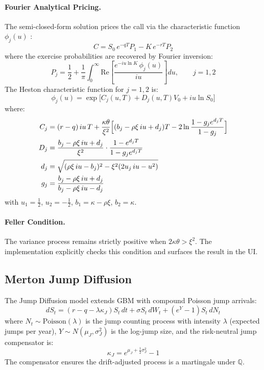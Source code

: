 \documentclass[12pt,a4paper]{article}
\begin{document}
\paragraph{Fourier Analytical Pricing.}
The semi-closed-form solution prices the call via the characteristic function $\phi_j(u)$ \parencite{heston1993}:
\begin{equation}
C = S_0\,e^{-qT}P_1 - K\,e^{-rT}P_2
\end{equation}
where the exercise probabilities are recovered by Fourier inversion:
\begin{equation}
P_j = \frac{1}{2} + \frac{1}{\pi}\int_0^{\infty}\text{Re}\!\left[\frac{e^{-iu\ln K}\,\phi_j(u)}{iu}\right]du, \qquad j=1,2
\end{equation}
The Heston characteristic function for $j=1,2$ is:
\begin{equation}
\phi_j(u) = \exp\!\bigl[C_j(u,T) + D_j(u,T)V_0 + iu\ln S_0\bigr]
\end{equation}
where:
\begin{align}
C_j &= (r-q)\,iu\,T + \frac{\kappa\theta}{\xi^2}\Bigl[(b_j - \rho\xi\,iu + d_j)T - 2\ln\frac{1 - g_j e^{d_j T}}{1 - g_j}\Bigr] \\
D_j &= \frac{b_j - \rho\xi\,iu + d_j}{\xi^2}\cdot\frac{1 - e^{d_j T}}{1 - g_j e^{d_j T}} \\
d_j &= \sqrt{(\rho\xi\,iu - b_j)^2 - \xi^2(2u_j\,iu - u^2)} \\
g_j &= \frac{b_j - \rho\xi\,iu + d_j}{b_j - \rho\xi\,iu - d_j}
\end{align}
with $u_1 = \tfrac{1}{2}$, $u_2 = -\tfrac{1}{2}$, $b_1 = \kappa - \rho\xi$, $b_2 = \kappa$.

\paragraph{Feller Condition.}
The variance process remains strictly positive when $2\kappa\theta > \xi^2$. The implementation explicitly checks this condition and surfaces the result in the UI.

\subsection{Merton Jump Diffusion}

The Jump Diffusion model \parencite{merton1976} extends GBM with compound Poisson jump arrivals:
\begin{equation}
dS_t = (r - q - \lambda\kappa_J)S_t\,dt + \sigma S_t\,dW_t + (e^Y - 1)S_t\,dN_t
\end{equation}
where $N_t \sim \text{Poisson}(\lambda)$ is the jump counting process with intensity $\lambda$ (expected jumps per year), $Y \sim N(\mu_J, \sigma_J^2)$ is the log-jump size, and the risk-neutral jump compensator is:
\begin{equation}
\kappa_J = e^{\mu_J + \frac{1}{2}\sigma_J^2} - 1
\end{equation}
The compensator ensures the drift-adjusted process is a martingale under $\mathbb{Q}$.
\end{document}
